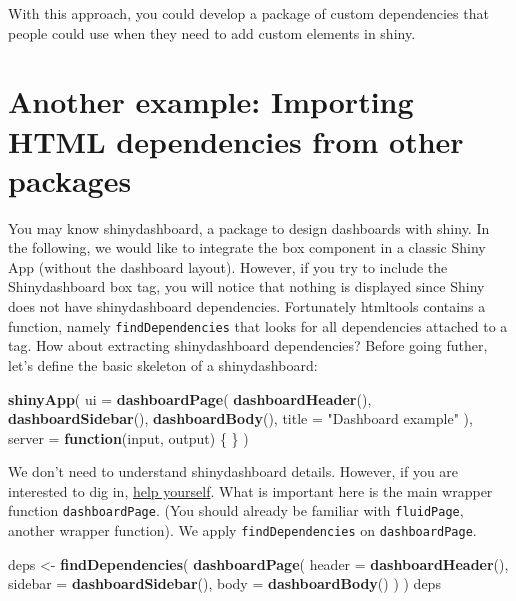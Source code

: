 \documentclass[]{book}
\newenvironment{Shaded}{\begin{snugshade}}{\end{snugshade}}
\newcommand{\ControlFlowTok}[1]{\textcolor[rgb]{0.13,0.29,0.53}{\textbf{#1}}}
\newcommand{\DataTypeTok}[1]{\textcolor[rgb]{0.13,0.29,0.53}{#1}}
\newcommand{\KeywordTok}[1]{\textcolor[rgb]{0.13,0.29,0.53}{\textbf{#1}}}
\newcommand{\NormalTok}[1]{#1}
\newcommand{\StringTok}[1]{\textcolor[rgb]{0.31,0.60,0.02}{#1}}
\begin{document}
With this approach, you could develop a package of custom dependencies that people
could use when they need to add custom elements in shiny.

\hypertarget{another-example-importing-html-dependencies-from-other-packages}{%
\section{Another example: Importing HTML dependencies from other packages}\label{another-example-importing-html-dependencies-from-other-packages}}

You may know shinydashboard, a package to design dashboards with shiny. In the following, we would like to integrate the box component in a classic Shiny App (without the dashboard layout). However, if you try to include the Shinydashboard box tag, you will notice that nothing is displayed since Shiny does not have shinydashboard dependencies. Fortunately htmltools contains a function, namely \texttt{findDependencies} that looks for all dependencies attached to a tag. How about extracting shinydashboard dependencies? Before going futher, let's define the basic skeleton of a shinydashboard:

\begin{Shaded}
\begin{Highlighting}[]
\KeywordTok{shinyApp}\NormalTok{(}
  \DataTypeTok{ui =} \KeywordTok{dashboardPage}\NormalTok{(}
    \KeywordTok{dashboardHeader}\NormalTok{(),}
    \KeywordTok{dashboardSidebar}\NormalTok{(),}
    \KeywordTok{dashboardBody}\NormalTok{(),}
    \DataTypeTok{title =} \StringTok{"Dashboard example"}
\NormalTok{  ),}
  \DataTypeTok{server =} \ControlFlowTok{function}\NormalTok{(input, output) \{ \}}
\NormalTok{)}
\end{Highlighting}
\end{Shaded}

We don't need to understand shinydashboard details. However, if you are interested to dig in, \href{https://rstudio.github.io/shinydashboard/}{help yourself}. What is important here is the main
wrapper function \texttt{dashboardPage}. (You should already be familiar with \texttt{fluidPage}, another wrapper function). We apply \texttt{findDependencies} on \texttt{dashboardPage}.

\begin{Shaded}
\begin{Highlighting}[]
\NormalTok{deps <-}\StringTok{ }\KeywordTok{findDependencies}\NormalTok{(}
  \KeywordTok{dashboardPage}\NormalTok{(}
    \DataTypeTok{header =} \KeywordTok{dashboardHeader}\NormalTok{(), }
    \DataTypeTok{sidebar =} \KeywordTok{dashboardSidebar}\NormalTok{(), }
    \DataTypeTok{body =} \KeywordTok{dashboardBody}\NormalTok{()}
\NormalTok{  )}
\NormalTok{)}
\NormalTok{deps}
\end{Highlighting}
\end{Shaded}
\end{document}
